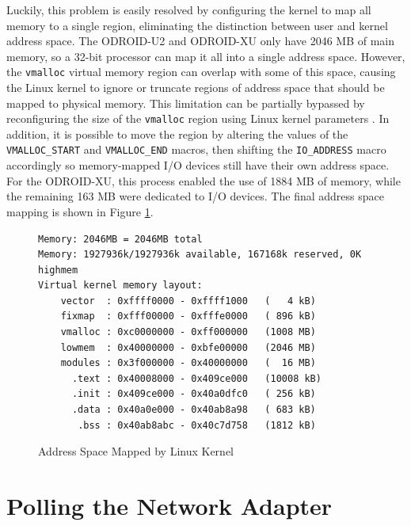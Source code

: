 \documentclass[11pt]{book}
\begin{document}
Luckily, this problem is easily resolved by configuring the kernel to map all memory to a
single region, eliminating the distinction between user and kernel address space.  The
ODROID-U2 and ODROID-XU only have 2046 MB of main memory, so a 32-bit processor can map it
all into a single address space.  However, the \verb;vmalloc; virtual memory region can
overlap with some of this space, causing the Linux kernel to ignore or truncate regions of
address space that should be mapped to physical memory.  This limitation can be partially
bypassed by reconfiguring the size of the \verb;vmalloc; region using Linux kernel
parameters \cite{vmalloc-overlap}.  In addition, it is possible to move the region by
altering the values of the \verb;VMALLOC_START; and \verb;VMALLOC_END; macros, then
shifting the \verb;IO_ADDRESS; macro accordingly so memory-mapped I/O devices still have
their own address space.  For the ODROID-XU, this process enabled the use of 1884 MB of
memory, while the remaining 163 MB were dedicated to I/O devices.  The final address space
mapping is shown in Figure \ref{addrmap}.


\begin{figure}
\begin{center}
\begin{verbatim}
Memory: 2046MB = 2046MB total
Memory: 1927936k/1927936k available, 167168k reserved, 0K highmem
Virtual kernel memory layout:
    vector  : 0xffff0000 - 0xffff1000   (   4 kB)
    fixmap  : 0xfff00000 - 0xfffe0000   ( 896 kB)
    vmalloc : 0xc0000000 - 0xff000000   (1008 MB)
    lowmem  : 0x40000000 - 0xbfe00000   (2046 MB)
    modules : 0x3f000000 - 0x40000000   (  16 MB)
      .text : 0x40008000 - 0x409ce000   (10008 kB)
      .init : 0x409ce000 - 0x40a0dfc0   ( 256 kB)
      .data : 0x40a0e000 - 0x40ab8a98   ( 683 kB)
       .bss : 0x40ab8abc - 0x40c7d758   (1812 kB)
\end{verbatim}
\end{center}
\caption{Address Space Mapped by Linux Kernel}
\label{addrmap}
\end{figure}

\section{Polling the Network Adapter}
\end{document}
